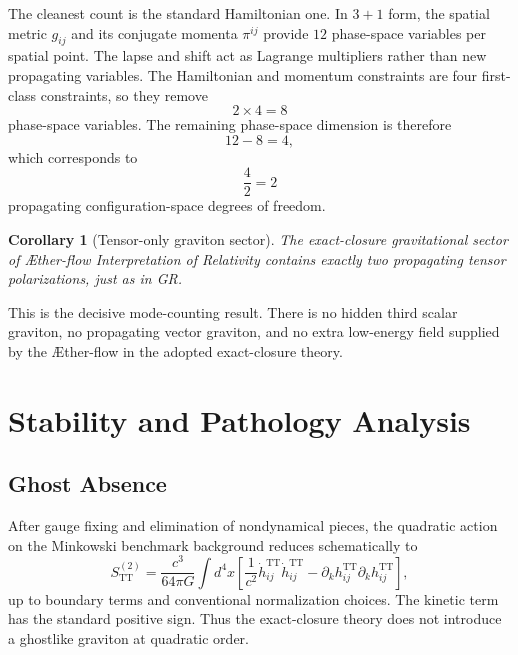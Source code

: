 \documentclass[11pt]{article}
\newcommand{\Aflow}{\AE{}ther-flow}
\newcommand{\TheoryName}{\Aflow{} Interpretation of Relativity}
\newcommand{\TT}{\mathrm{TT}}
\newtheorem{corollary}{Corollary}
\begin{document}
The cleanest count is the standard Hamiltonian one. In \(3+1\) form, the spatial metric \(g_{ij}\) and its conjugate momenta \(\pi^{ij}\) provide \(12\) phase-space variables per spatial point. The lapse and shift act as Lagrange multipliers rather than new propagating variables. The Hamiltonian and momentum constraints are four first-class constraints, so they remove
\begin{equation}
2\times 4 = 8
\label{eq:firstclassremoval}
\end{equation}
phase-space variables. The remaining phase-space dimension is therefore
\begin{equation}
12-8=4,
\label{eq:phasespacecount}
\end{equation}
which corresponds to
\begin{equation}
\frac{4}{2}=2
\label{eq:configcount}
\end{equation}
propagating configuration-space degrees of freedom.

\begin{corollary}[Tensor-only graviton sector]
The exact-closure gravitational sector of \TheoryName{} contains exactly two propagating tensor polarizations, just as in GR.
\end{corollary}

This is the decisive mode-counting result. There is no hidden third scalar graviton, no propagating vector graviton, and no extra low-energy field supplied by the \Aflow{} in the adopted exact-closure theory.

\section{Stability and Pathology Analysis}

\subsection{Ghost Absence}

After gauge fixing and elimination of nondynamical pieces, the quadratic action on the Minkowski benchmark background reduces schematically to
\begin{equation}
S_{\TT}^{(2)}
=
\frac{c^3}{64\pi G}
\int d^4x
\left[
\frac{1}{c^2}\dot h_{ij}^{\TT}\dot h_{ij}^{\TT}
-
\partial_k h_{ij}^{\TT}\partial_k h_{ij}^{\TT}
\right],
\label{eq:ttaction}
\end{equation}
up to boundary terms and conventional normalization choices. The kinetic term has the standard positive sign. Thus the exact-closure theory does not introduce a ghostlike graviton at quadratic order.
\end{document}
